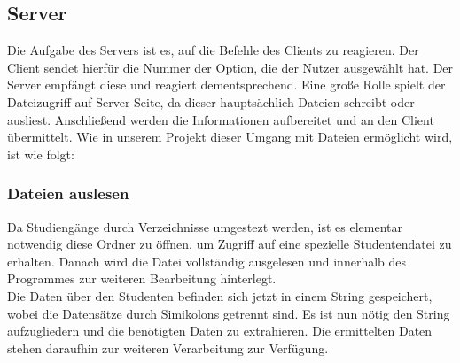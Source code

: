 \documentclass{scrartcl}
\begin{document}
	\subsection{Server}
		Die Aufgabe des Servers ist es, auf die Befehle des Clients zu reagieren. Der Client sendet hierfür die Nummer der Option, die der Nutzer ausgewählt hat. Der Server empfängt diese und reagiert dementsprechend. Eine große Rolle spielt der Dateizugriff auf Server Seite, da dieser hauptsächlich Dateien schreibt oder ausliest. Anschließend werden die Informationen aufbereitet und an den Client übermittelt. Wie in unserem Projekt dieser Umgang mit Dateien ermöglicht wird, ist wie folgt:
		\subsubsection{Dateien auslesen}
			Da Studiengänge durch Verzeichnisse umgestezt werden, ist es elementar notwendig diese Ordner zu öffnen, um Zugriff auf eine spezielle Studentendatei zu erhalten. Danach wird die Datei vollständig ausgelesen und innerhalb des Programmes zur weiteren Bearbeitung hinterlegt.\\
			Die Daten über den Studenten befinden sich jetzt in einem String gespeichert, wobei die Datensätze durch Simikolons getrennt sind. Es ist nun nötig den String aufzugliedern und die benötigten Daten zu extrahieren. Die ermittelten Daten stehen daraufhin zur weiteren Verarbeitung zur Verfügung.
\end{document}
